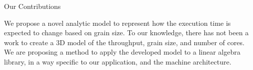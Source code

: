 \documentclass[10pt]{beamer}
\begin{document}
%			


\begin{frame}{Our Contributions}
	\begin{outline}
		\1We propose a novel analytic model to represent how the execution time is expected to change based on grain size.
		\1To our knowledge, there has not been a work to create a 3D model of the throughput, grain size, and number of cores. 
		\1We are proposing a method to apply the developed model to a linear algebra library, in a way specific to our application, and the machine architecture.
	\end{outline}
\end{frame}
\end{document}
